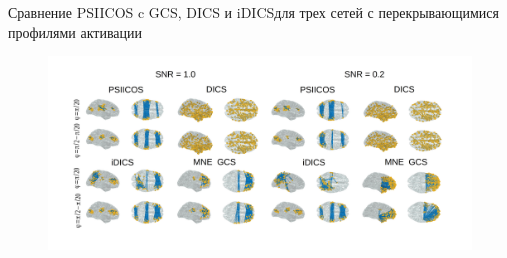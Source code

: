 \documentclass[12pt]{beamer}
\begin{document}
\begin{frame}{Сравнение PSIICOS c GCS, DICS и iDICS}{для трех сетей с перекрывающимися профилями активации}
\begin{figure}[!ht]
 \includegraphics[width=1\textwidth]{../images/psiicos_paper/Figure5_hr.jpg}
\end{figure}%
\end{frame}
\end{document}
